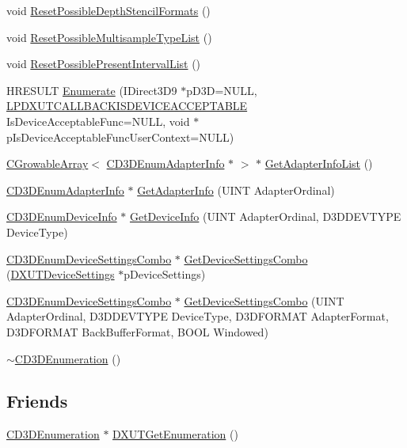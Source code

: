 \begin{DoxyCompactItemize}
void \hyperlink{class_c_d3_d_enumeration_a4129dc6557f638c49f7d33a9b788070f}{ResetPossibleDepthStencilFormats} ()
\item 
void \hyperlink{class_c_d3_d_enumeration_a8209982a323e3fa1e90779bf2114bda8}{ResetPossibleMultisampleTypeList} ()
\item 
void \hyperlink{class_c_d3_d_enumeration_ab5d8cfd17ddf102f83f8b2b19a904283}{ResetPossiblePresentIntervalList} ()
\item 
HRESULT \hyperlink{class_c_d3_d_enumeration_aa5114cc4e4ca9c064b27b1284fc1322a}{Enumerate} (IDirect3D9 $\ast$pD3D=NULL, \hyperlink{_d_x_u_t_8h_ae2d164ed8b3156b379e09db1cbead165}{LPDXUTCALLBACKISDEVICEACCEPTABLE} IsDeviceAcceptableFunc=NULL, void $\ast$pIsDeviceAcceptableFuncUserContext=NULL)
\item 
\hyperlink{class_c_growable_array}{CGrowableArray}$<$ \hyperlink{class_c_d3_d_enum_adapter_info}{CD3DEnumAdapterInfo} $\ast$ $>$ $\ast$ \hyperlink{class_c_d3_d_enumeration_a4ba124e20eacf7ae3e4ec992b0cca7b5}{GetAdapterInfoList} ()
\item 
\hyperlink{class_c_d3_d_enum_adapter_info}{CD3DEnumAdapterInfo} $\ast$ \hyperlink{class_c_d3_d_enumeration_a3a817a286d0ffc931a2ba3702149b6ee}{GetAdapterInfo} (UINT AdapterOrdinal)
\item 
\hyperlink{class_c_d3_d_enum_device_info}{CD3DEnumDeviceInfo} $\ast$ \hyperlink{class_c_d3_d_enumeration_a6324bb0b0ea8e89495d4d9372983d162}{GetDeviceInfo} (UINT AdapterOrdinal, D3DDEVTYPE DeviceType)
\item 
\hyperlink{struct_c_d3_d_enum_device_settings_combo}{CD3DEnumDeviceSettingsCombo} $\ast$ \hyperlink{class_c_d3_d_enumeration_ac005a832569d4b0365abd49b3ff5b8cf}{GetDeviceSettingsCombo} (\hyperlink{struct_d_x_u_t_device_settings}{DXUTDeviceSettings} $\ast$pDeviceSettings)
\item 
\hyperlink{struct_c_d3_d_enum_device_settings_combo}{CD3DEnumDeviceSettingsCombo} $\ast$ \hyperlink{class_c_d3_d_enumeration_ae344a1fde9c6b0f784edd8a2c1828416}{GetDeviceSettingsCombo} (UINT AdapterOrdinal, D3DDEVTYPE DeviceType, D3DFORMAT AdapterFormat, D3DFORMAT BackBufferFormat, BOOL Windowed)
\item 
\hyperlink{class_c_d3_d_enumeration_adf74c5d5a66b22c849702ae86080076e}{$\sim$CD3DEnumeration} ()
\end{DoxyCompactItemize}
\subsection*{Friends}
\begin{DoxyCompactItemize}
\item 
\hyperlink{class_c_d3_d_enumeration}{CD3DEnumeration} $\ast$ \hyperlink{class_c_d3_d_enumeration_a36f187d396a6e71a483f426d9beb0ed0}{DXUTGetEnumeration} ()
\end{DoxyCompactItemize}


